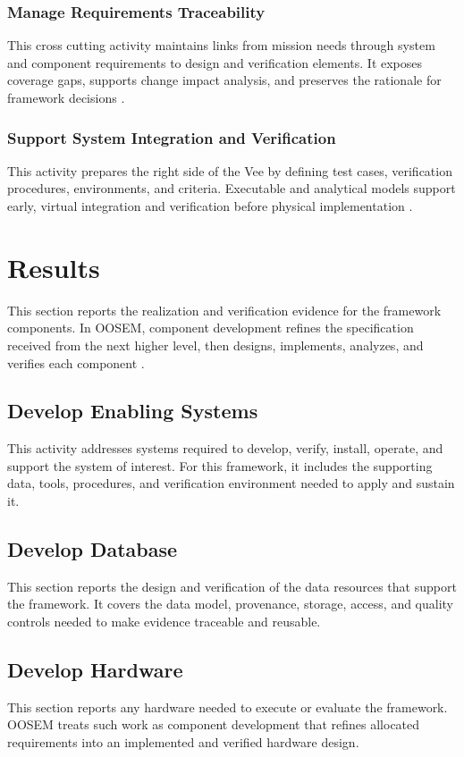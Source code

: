 \documentclass[11pt,a4paper]{article}
\begin{document}
\subsubsection{Manage Requirements Traceability}
\label{subsubsection:manage-requirements-traceability}
This cross cutting activity maintains links from mission needs through system and component requirements to design and verification elements. It exposes coverage gaps, supports change impact analysis, and preserves the rationale for framework decisions \cite{friedenthal2014practical}.

\subsubsection{Support System Integration and Verification}
This activity prepares the right side of the Vee by defining test cases, verification procedures, environments, and criteria. Executable and analytical models support early, virtual integration and verification before physical implementation \cite{friedenthal2014practical}.

\section{Results}
This section reports the realization and verification evidence for the framework components. In OOSEM, component development refines the specification received from the next higher level, then designs, implements, analyzes, and verifies each component \citep{friedenthal2014practical}.

\subsection{Develop Enabling Systems}
This activity addresses systems required to develop, verify, install, operate, and support the system of interest. For this framework, it includes the supporting data, tools, procedures, and verification environment needed to apply and sustain it.

\subsection{Develop Database}
This section reports the design and verification of the data resources that support the framework. It covers the data model, provenance, storage, access, and quality controls needed to make evidence traceable and reusable.

\subsection{Develop Hardware}
This section reports any hardware needed to execute or evaluate the framework. OOSEM treats such work as component development that refines allocated requirements into an implemented and verified hardware design.
\end{document}
